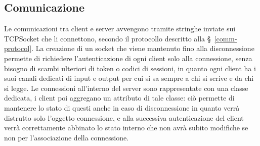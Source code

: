 \clearpage
\subsection{Comunicazione}
\label{communication-section}

Le comunicazioni tra client e server avvengono tramite stringhe inviate sui TCPSocket che li connettono, secondo il protocollo descritto alla \S\ \ref{comm-protocol}. La creazione di un socket che viene mantenuto fino alla disconnessione permette di richiedere l'autenticazione di ogni client solo alla connessione, senza bisogno di scambi ulteriori di token o codici di sessioni, in quanto ogni client ha i suoi canali dedicati di input e output per cui si sa sempre a chi si scrive e da chi si legge. Le connessioni all'interno del server sono rappresentate con una classe dedicata, i client poi aggregano un attributo di tale classe: ciò permette di mantenere lo stato di questi anche in caso di disconnessione in quanto verrà distrutto solo l'oggetto connessione, e alla successiva autenticazione del client verrà correttamente abbinato lo stato interno che non avrà subito modifiche se non per l'associazione della connessione.
